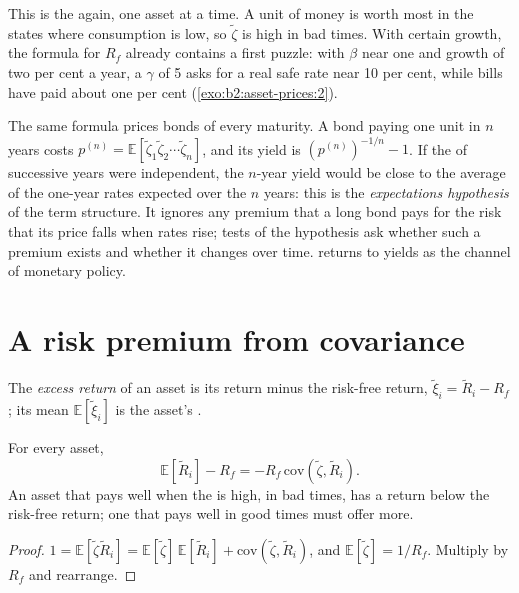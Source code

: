 This is the  again, one asset at a time. A unit of money is worth most in the states where
consumption is low, so $\tilde\zeta$ is high in bad times. With certain growth, the formula for $R_f$
already contains a first puzzle: with $\beta$ near one and growth of two per cent a year, a $\gamma$ of 5
asks for a real safe rate near 10 per cent, while bills have paid about one per cent
(\cref{exo:b2:asset-prices:2}).

The same formula prices bonds of every maturity. A bond paying one unit in $n$ years costs $p^{(n)} =
\mathbb{E}[\tilde\zeta_1\tilde\zeta_2\cdots\tilde\zeta_n]$, and its yield is $(p^{(n)})^{-1/n} - 1$.
If the  of successive years were independent, the $n$-year yield would be close to the
average of the one-year rates expected over the $n$ years: this is the \emph{expectations hypothesis}
of the term structure. It ignores any premium that a long bond pays for the risk that its price falls
when rates rise; tests of the hypothesis ask whether such a premium exists and whether it changes over
time.  returns to yields as the channel of monetary policy.

\section{A risk premium from covariance}\label{sec:b2:asset-prices:premium}

\begin{definition}\label{def:b2:asset-prices:excess-return}
The \emph{excess return} of an asset is its return minus the risk-free return,
$\tilde\xi_i = \tilde R_i - R_f$; its mean $\mathbb{E}[\tilde\xi_i]$ is the asset's .
\end{definition}

\begin{proposition}\label{prop:b2:asset-prices:covariance}
For every asset,
\[
\mathbb{E}[\tilde R_i] - R_f = -R_f\,\mathrm{cov}(\tilde\zeta, \tilde R_i).
\]
An asset that pays well when the  is high, in bad times, has a return below the
risk-free return; one that pays well in good times must offer more.
\end{proposition}

\begin{proof}
$1 = \mathbb{E}[\tilde\zeta\tilde R_i] = \mathbb{E}[\tilde\zeta]\,\mathbb{E}[\tilde R_i] +
\mathrm{cov}(\tilde\zeta, \tilde R_i)$, and $\mathbb{E}[\tilde\zeta] = 1/R_f$. Multiply by $R_f$ and
rearrange.
\end{proof}

